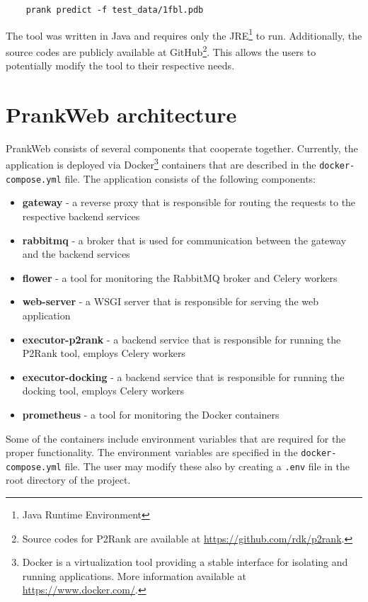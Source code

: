\begin{Verbatim}
    prank predict -f test_data/1fbl.pdb 
\end{Verbatim}

The tool was written in Java and requires only the JRE\footnote{Java Runtime Environment} to run. Additionally, the source codes are publicly available at GitHub\footnote{Source codes for P2Rank are available at \url{https://github.com/rdk/p2rank}.}. This allows the users to potentially modify the tool to their respective needs. 

\section{PrankWeb architecture}

PrankWeb consists of several components that cooperate together. Currently, the application is deployed via Docker\footnote{Docker is a virtualization tool providing a stable interface for isolating and running applications. More information available at \url{https://www.docker.com/}.} containers that are described in the \texttt{docker-compose.yml} file. The application consists of the following components:

\begin{itemize}
    \item \textbf{gateway} - a reverse proxy that is responsible for routing the requests to the respective backend services
    \item \textbf{rabbitmq} - a broker that is used for communication between the gateway and the backend services
    \item \textbf{flower} - a tool for monitoring the RabbitMQ broker and Celery workers
    \item \textbf{web-server} - a WSGI server that is responsible for serving the web application
    \item \textbf{executor-p2rank} - a backend service that is responsible for running the P2Rank tool, employs Celery workers
    \item \textbf{executor-docking} - a backend service that is responsible for running the docking tool, employs Celery workers 
    \item \textbf{prometheus} - a tool for monitoring the Docker containers 
\end{itemize}

Some of the containers include environment variables that are required for the proper functionality. The environment variables are specified in the \texttt{docker-compose.yml} file. The user may modify these also by creating a \texttt{.env} file in the root directory of the project.

